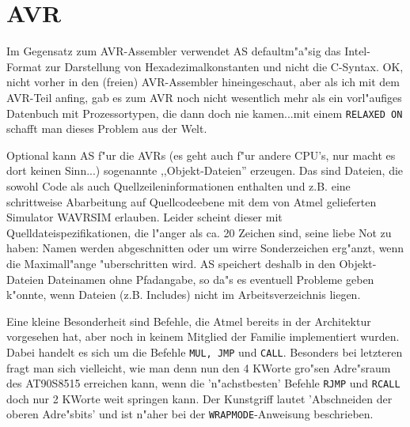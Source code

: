 \documentclass[12pt,a4paper,twoside]{report}
\newcommand{\tty}[1]{{\tt #1}}
\newcommand{\asname}{AS}
\begin{document}

\section{AVR}

Im Gegensatz zum AVR-Assembler verwendet \asname{} defaultm"a"sig das Intel-Format
zur Darstellung von Hexadezimalkonstanten und nicht die C-Syntax.  OK, nicht
vorher in den (freien) AVR-Assembler hineingeschaut, aber als ich mit dem
AVR-Teil anfing, gab es zum AVR noch nicht wesentlich mehr als ein
vorl"aufiges Datenbuch mit Prozessortypen, die dann doch nie kamen...mit
einem \tty{RELAXED ON} schafft man dieses Problem aus der Welt.

Optional kann \asname{} f"ur die AVRs (es geht auch f"ur andere CPU's, nur
macht es dort keinen Sinn...) sogenannte ,,Objekt-Dateien'' erzeugen.
Das sind Dateien, die sowohl Code als auch Quellzeileninformationen
enthalten und z.B. eine schrittweise Abarbeitung auf Quellcodeebene
mit dem von Atmel gelieferten Simulator WAVRSIM erlauben.  Leider
scheint dieser mit Quelldateispezifikationen, die l"anger als ca. 20
Zeichen sind, seine liebe Not zu haben: Namen werden abgeschnitten
oder um wirre Sonderzeichen erg"anzt, wenn die Maximall"ange "uberschritten
wird.  \asname{} speichert deshalb in den Objekt-Dateien Dateinamen ohne
Pfadangabe, so da"s es eventuell Probleme geben k"onnte, wenn
Dateien (z.B. Includes) nicht im Arbeitsverzeichnis liegen.

Eine kleine Besonderheit sind Befehle, die Atmel bereits in der
Architektur vorgesehen hat, aber noch in keinem Mitglied der Familie
implementiert wurden.  Dabei handelt es sich um die Befehle {\tt MUL, JMP}
und {\tt CALL}.  Besonders bei letzteren fragt man sich vielleicht, wie man
denn nun den 4 KWorte gro"sen Adre"sraum des AT90S8515 erreichen kann,
wenn die 'n"achstbesten' Befehle {\tt RJMP} und {\tt RCALL} doch nur 2
KWorte weit springen kann.  Der Kunstgriff lautet 'Abschneiden der oberen
Adre"sbits' und ist n"aher bei der {\tt WRAPMODE}-Anweisung beschrieben.
\end{document}

